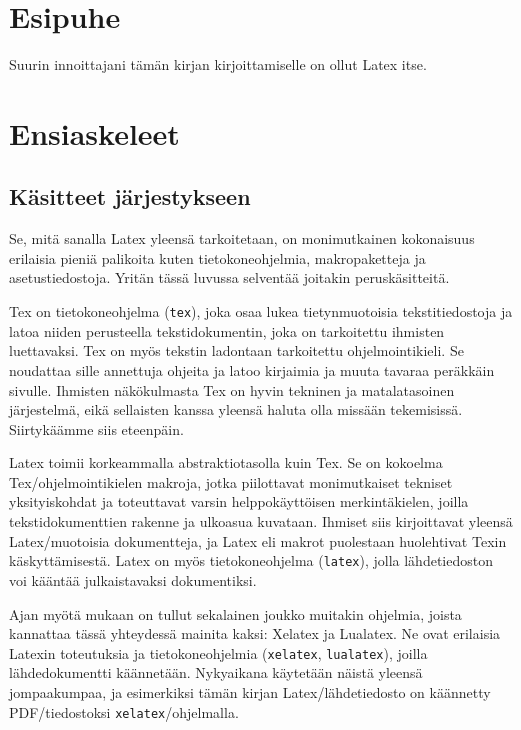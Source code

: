 \documentclass[a4paper,10pt,notitlepage,oneside]{book}
\newcommand{\koodi}[1]{\texttt{#1}}
\begin{document}
\pagestyle{fancy}


\chapter*{Esipuhe}

Suurin innoittajani tämän kirjan kirjoittamiselle on ollut Latex itse.

\chapter{Ensiaskeleet}
\section{Käsitteet järjestykseen}

Se, mitä sanalla Latex yleensä tarkoitetaan, on monimutkainen
kokonaisuus erilaisia pieniä palikoita kuten tietokone\-ohjelmia,
makropaketteja ja asetustiedostoja. Yritän tässä luvussa selventää
joitakin peruskäsitteitä.

Tex on tietokone\-ohjelma (\koodi{tex}), joka osaa lukea tietynmuotoisia
tekstitiedostoja ja latoa niiden perusteella tekstidokumentin, joka on
tarkoitettu ihmisten luettavaksi. Tex on myös tekstin ladontaan
tarkoitettu ohjelmointikieli. Se noudattaa sille annettuja ohjeita ja
latoo kirjaimia ja muuta tavaraa peräkkäin sivulle. Ihmisten
näkökulmasta Tex on hyvin tekninen ja matalatasoinen järjestelmä, eikä
sellaisten kanssa yleensä haluta olla missään tekemisissä. Siirtykäämme
siis eteenpäin.

Latex toimii korkeammalla abstraktiotasolla kuin Tex. Se on kokoelma
Tex\-/ohjelmointikielen makroja, jotka piilottavat monimutkaiset
tekniset yksityiskohdat ja toteuttavat varsin helppokäyttöisen
merkintäkielen, joilla tekstidokumenttien rakenne ja ulko\-asua
kuvataan. Ihmiset siis kirjoittavat yleensä Latex\-/muotoisia
dokumentteja, ja Latex eli makrot puolestaan huolehtivat Texin
käskyttämisestä. Latex on myös tietokone\-ohjelma (\koodi{latex}), jolla
lähdetiedoston voi kääntää julkaistavaksi dokumentiksi.

Ajan myötä mukaan on tullut sekalainen joukko muitakin ohjelmia, joista
kannattaa tässä yhteydessä mainita kaksi: Xelatex ja Lualatex. Ne ovat
erilaisia Latexin toteutuksia ja tietokone\-ohjelmia (\koodi{xelatex},
\koodi{lualatex}), joilla lähdedokumentti käännetään. Nyky\-aikana
käytetään näistä yleensä jompaakumpaa, ja esimerkiksi tämän kirjan
Latex\-/lähdetiedosto on käännetty PDF\-/tiedostoksi
\koodi{xelatex}\-/ohjelmalla.
\end{document}
